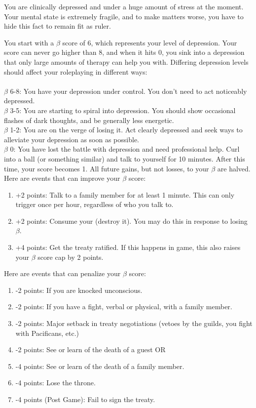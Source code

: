 \documentclass[green]{NeptuneBall}
\begin{document}
\name{\gDepression{}}

You are clinically depressed and under a huge amount of stress at the moment. Your mental state is extremely fragile, and to make matters worse, you have to hide this fact to remain fit as ruler.

You start with a $\beta$ score of 6, which represents your level of depression. Your score can never go higher than 8, and when it hits 0, you sink into a depression that only large amounts of therapy can help you with. Differing depression levels should affect your roleplaying in different ways: \\ \\
$\beta$ 6-8: You have your depression under control. You don't need to act noticeably depressed. \\
$\beta$ 3-5: You are starting to spiral into depression. You should show occasional flashes of dark thoughts, and be generally less energetic. \\
$\beta$ 1-2: You are on the verge of losing it. Act clearly depressed and seek ways to alleviate your depression as soon as possible. \\
$\beta$ 0: You have lost the battle with depression and need professional help. Curl into a ball (or something similar) and talk to yourself for 10 minutes. After this time, your score becomes 1. All future gains, but not losses, to your $\beta$ are halved. \\

Here are events that can improve your $\beta$ score: 

\begin{enumerate}
\item +2 points: Talk to a family member for at least 1 minute. This can only trigger once per hour, regardless of who you talk to.
\item +2 points: Consume your \iTablets{} (destroy it). You may do this in response to losing $\beta$.
\item +4 points: Get the treaty ratified. If this happens in game, this also raises your $\beta$ score cap by 2 points.
\end{enumerate}

Here are events that can penalize your $\beta$ score:

\begin{enumerate}
\item -2 points: If you are knocked unconscious.
\item -2 points: If you have a fight, verbal or physical, with a family member.
\item -2 points: Major setback in treaty negotiations (vetoes by the guilds, you fight with Pacificans, etc.)
\item -2 points: See or learn of the death of a guest OR
\item -4 points: See or learn of the death of a family member.
\item -4 points: Lose the throne.
\item -4 points (Post Game): Fail to sign the treaty.
\end{enumerate}
\end{document}
